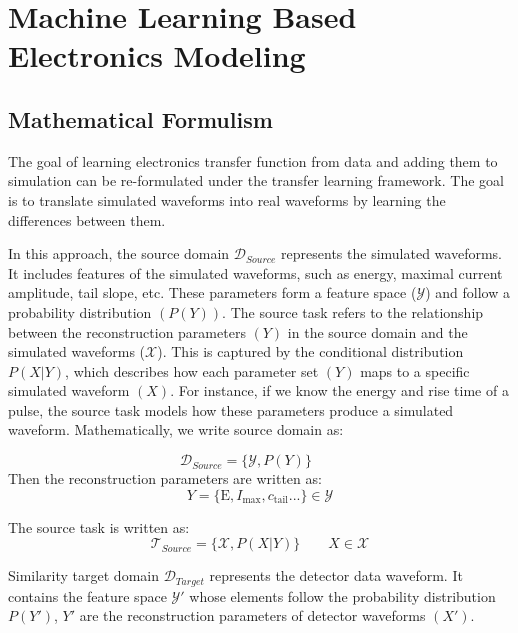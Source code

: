 \section{Machine Learning Based Electronics Modeling}
\subsection{Mathematical Formulism}
The goal of learning electronics transfer function from data and adding them to simulation can be re-formulated under the transfer learning framework. The goal is to translate simulated waveforms into real waveforms by learning the differences between them.

In this approach, the source domain $\mathcal{D}_{Source}$ represents the simulated waveforms. It includes features of the simulated waveforms, such as energy, maximal current amplitude, tail slope, etc. These parameters form a feature space ($\mathcal{Y}$) and follow a probability distribution $(P(Y))$. The source task refers to the relationship between the reconstruction parameters $(Y)$ in the source domain and the simulated waveforms ($\mathcal{X}$). This is captured by the conditional distribution $P(X|Y)$, which describes how each parameter set $(Y)$ maps to a specific simulated waveform $(X)$. For instance, if we know the energy and rise time of a pulse, the source task models how these parameters produce a simulated waveform. Mathematically, we write source domain as:

\begin{equation}
    \mathcal{D}_{Source}=\{\mathcal{Y},P(Y)\}\qquad 
    \label{eqn:source_domain}
\end{equation}
Then the reconstruction parameters are written as:
 \begin{equation}
     Y=\{\mathrm{E},I_{\mathrm{max}},c_{\mathrm{tail}}...\}\in \mathcal{Y}
 \end{equation}

The source task is written as:
\begin{equation}
    \mathcal{T}_{Source}=\{\mathcal{X},P(X|Y)\} \qquad X\in \mathcal{X}
    \label{eqn:source_task}
\end{equation}


Similarity target domain $\mathcal{D}_{Target}$ represents the detector data waveform. It contains the feature space $\mathcal{Y'}$ whose elements follow the probability distribution $P(Y')$, $Y'$ are the reconstruction parameters of detector waveforms $(X')$.

